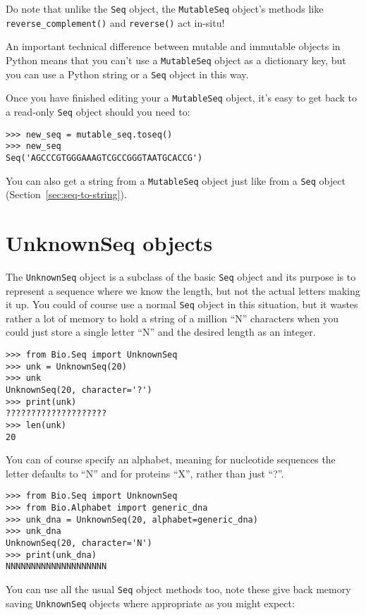 {Do note that unlike the \verb|Seq| object, the \verb|MutableSeq| object's methods like \verb|reverse_complement()| and \verb|reverse()| act in-situ!

An important technical difference between mutable and immutable objects in Python means that you can't use a \verb|MutableSeq| object as a dictionary key, but you can use a Python string or a \verb|Seq| object in this way.

Once you have finished editing your a \verb|MutableSeq| object, it's easy to get back to a read-only \verb|Seq| object should you need to:

\begin{verbatim}
>>> new_seq = mutable_seq.toseq()
>>> new_seq
Seq('AGCCCGTGGGAAAGTCGCCGGGTAATGCACCG')
\end{verbatim}

You can also get a string from a \verb|MutableSeq| object just like from a \verb|Seq| object (Section~\ref{sec:seq-to-string}).

\section{UnknownSeq objects}
The \verb|UnknownSeq| object is a subclass of the basic \verb|Seq| object
and its purpose is to represent a
sequence where we know the length, but not the actual letters making it up.
You could of course use a normal \verb|Seq| object in this situation, but it wastes
rather a lot of memory to hold a string of a million ``N'' characters when you could
just store a single letter ``N'' and the desired length as an integer.

\begin{verbatim}
>>> from Bio.Seq import UnknownSeq
>>> unk = UnknownSeq(20)
>>> unk
UnknownSeq(20, character='?')
>>> print(unk)
????????????????????
>>> len(unk)
20
\end{verbatim}

You can of course specify an alphabet, meaning for nucleotide sequences
the letter defaults to ``N'' and for proteins ``X'', rather than just ``?''.

\begin{verbatim}
>>> from Bio.Seq import UnknownSeq
>>> from Bio.Alphabet import generic_dna
>>> unk_dna = UnknownSeq(20, alphabet=generic_dna)
>>> unk_dna
UnknownSeq(20, character='N')
>>> print(unk_dna)
NNNNNNNNNNNNNNNNNNNN
\end{verbatim}

You can use all the usual \verb|Seq| object methods too, note these give back
memory saving \verb|UnknownSeq| objects where appropriate as you might expect:

}
